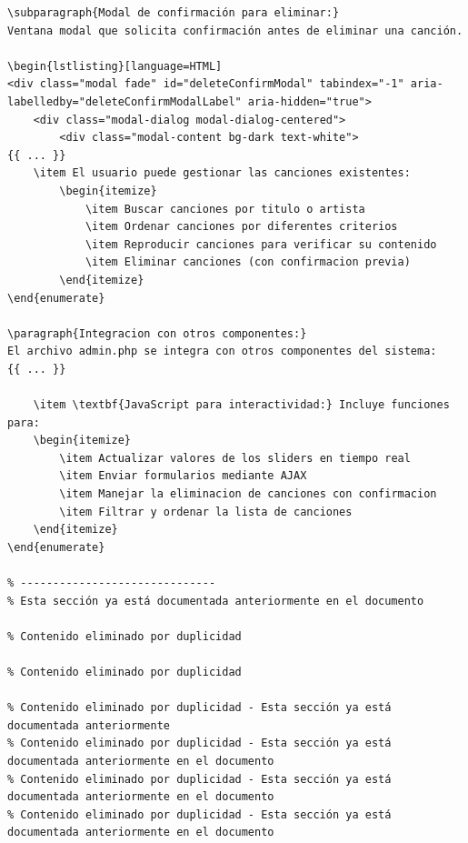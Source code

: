 \documentclass[a4paper,12pt]{article}
\begin{document}
\begin{itemize}
\begin{verbatim}
\subparagraph{Modal de confirmación para eliminar:}
Ventana modal que solicita confirmación antes de eliminar una canción.

\begin{lstlisting}[language=HTML]
<div class="modal fade" id="deleteConfirmModal" tabindex="-1" aria-labelledby="deleteConfirmModalLabel" aria-hidden="true">
    <div class="modal-dialog modal-dialog-centered">
        <div class="modal-content bg-dark text-white">
{{ ... }}
    \item El usuario puede gestionar las canciones existentes:
        \begin{itemize}
            \item Buscar canciones por titulo o artista
            \item Ordenar canciones por diferentes criterios
            \item Reproducir canciones para verificar su contenido
            \item Eliminar canciones (con confirmacion previa)
        \end{itemize}
\end{enumerate}

\paragraph{Integracion con otros componentes:}
El archivo admin.php se integra con otros componentes del sistema:
{{ ... }}
    
    \item \textbf{JavaScript para interactividad:} Incluye funciones para:
    \begin{itemize}
        \item Actualizar valores de los sliders en tiempo real
        \item Enviar formularios mediante AJAX
        \item Manejar la eliminacion de canciones con confirmacion
        \item Filtrar y ordenar la lista de canciones
    \end{itemize}
\end{enumerate}

% ------------------------------
% Esta sección ya está documentada anteriormente en el documento

% Contenido eliminado por duplicidad

% Contenido eliminado por duplicidad

% Contenido eliminado por duplicidad - Esta sección ya está documentada anteriormente
% Contenido eliminado por duplicidad - Esta sección ya está documentada anteriormente en el documento
% Contenido eliminado por duplicidad - Esta sección ya está documentada anteriormente en el documento
% Contenido eliminado por duplicidad - Esta sección ya está documentada anteriormente en el documento


\end{verbatim}
\end{itemize}
\end{document}
